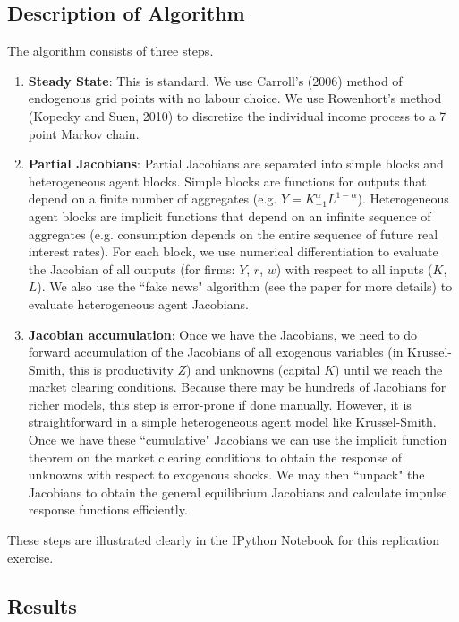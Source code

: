 \documentclass[10pt]{article} %
\begin{document}
\subsection*{Description of Algorithm}

The algorithm consists of three steps.

\begin{enumerate}
\item \textbf{Steady State}: This is standard. We use Carroll's (2006) method of endogenous grid points with no labour choice. We use Rowenhort's method (Kopecky and Suen, 2010) to discretize the individual income process to a 7 point Markov chain.
\item \textbf{Partial Jacobians}: Partial Jacobians are separated into simple blocks and heterogeneous agent blocks. Simple blocks are functions for outputs that depend on a finite number of aggregates (e.g. $Y=K_{-1}^\alpha L^{1-\alpha}$). Heterogeneous agent blocks are implicit functions that depend on an infinite sequence of aggregates (e.g. consumption depends on the entire sequence of future real interest rates). For each block, we use numerical differentiation to evaluate the Jacobian of all outputs (for firms: $Y$, $r$, $w$) with respect to all inputs ($K$, $L$). We also use the ``fake news" algorithm (see the paper for more details) to evaluate heterogeneous agent Jacobians.
\item \textbf{Jacobian accumulation}: Once we have the Jacobians, we need to do forward accumulation of the Jacobians of all exogenous variables (in Krussel-Smith, this is productivity $Z$) and unknowns (capital $K$) until we reach the market clearing conditions. Because there may be hundreds of Jacobians for richer models, this step is error-prone if done manually. However, it is straightforward in a simple heterogeneous agent model like Krussel-Smith. Once we have these ``cumulative" Jacobians we can use the implicit function theorem on the market clearing conditions to obtain the response of unknowns with respect to exogenous shocks. We may then ``unpack" the Jacobians to obtain the general equilibrium Jacobians and calculate impulse response functions efficiently.
\end{enumerate}

These steps are illustrated clearly in the IPython Notebook for this replication exercise.

\subsection*{Results}
\end{document}
